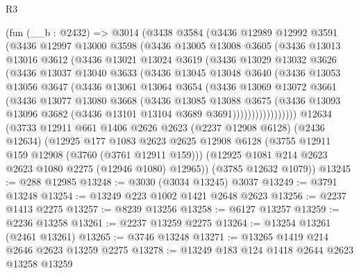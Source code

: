 \begin{lexlean}{R3}
\begin{coremodule}
    (fun (__b : @2432) =>
    @3014
      (@3438
        @3584
        (@3436
          @12989
          @12992
          @3591
          (@3436
            @12997
            @13000
            @3598
            (@3436
              @13005
              @13008
              @3605
              (@3436
                @13013
                @13016
                @3612
                (@3436
                  @13021
                  @13024
                  @3619
                  (@3436
                    @13029
                    @13032
                    @3626
                    (@3436
                      @13037
                      @13040
                      @3633
                      (@3436
                        @13045
                        @13048
                        @3640
                        (@3436
                          @13053
                          @13056
                          @3647
                          (@3436
                            @13061
                            @13064
                            @3654
                            (@3436
                              @13069
                              @13072
                              @3661
                              (@3436
                                @13077
                                @13080
                                @3668
                                (@3436
                                  @13085
                                  @13088
                                  @3675
                                  (@3436
                                    @13093
                                    @13096
                                    @3682
                                    (@3436 @13101 @13104 @3689 @3691)))))))))))))))))
    @12634
    (@3733
      @12911
      @661
      @1406
      @2626
      @2623
      (@2237 @12908 @6128)
      (@2436 @12634)
      (@12925
        @177
        @1083
        @2623
        @2625
        @12908
        @6128
        (@3755 @12911 @159 @12908 (@3760 (@3761 @12911 @159)))
        (@12925 @1081 @214 @2623 @2623 @1080 @2275 (@12946 @1080) @12965))
      (@3785 @12632 @1079))
@13245 := @288 @12985
@13248 := @3030 (@3034 @13245) @3037
@13249 := @3791 @13248
@13254 := @13249 @223 @1002 @1421 @2648 @2623
@13256 := @2237 @1413 @2275
@13257 := @8239 @13256
@13258 := @6127 @13257
@13259 := @2236 @13258
@13261 := @2237 @13259 @2275
@13264 := @13254 @13261 (@2461 @13261)
@13265 := @3746 @13248
@13271 := @13265 @1419 @214 @2646 @2623 @13259 @2275
@13278 := @13249 @183 @124 @1418 @2644 @2623 @13258 @13259

\end{coremodule}
\end{lexlean}
